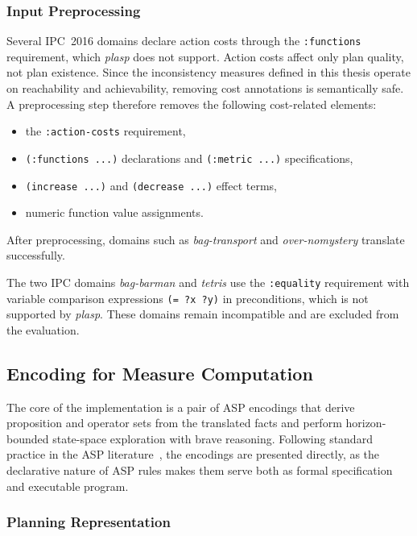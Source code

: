 \subsubsection{Input Preprocessing}

Several \ac{IPC}~2016 domains declare action costs through the \texttt{:functions} requirement, which \textit{plasp} does not support. Action costs affect only plan quality, not plan existence. Since the inconsistency measures defined in this thesis operate on reachability and achievability, removing cost annotations is semantically safe. A preprocessing step therefore removes the following cost-related elements:
\begin{itemize}
    \item the \texttt{:action-costs} requirement,
    \item \texttt{(:functions ...)} declarations and \texttt{(:metric ...)} specifications,
    \item \texttt{(increase ...)} and \texttt{(decrease ...)} effect terms,
    \item numeric function value assignments.
\end{itemize}
After preprocessing, domains such as \textit{bag-transport} and \textit{over-nomystery} translate successfully.

The two \ac{IPC} domains \textit{bag-barman} and \textit{tetris} use the \texttt{:equality} requirement with variable comparison expressions \texttt{(= ?x ?y)} in preconditions, which is not supported by \textit{plasp}. These domains remain incompatible and are excluded from the evaluation.

\subsection{Encoding for Measure Computation}
\label{sec:asp_encoding}

The core of the implementation is a pair of \ac{ASP} encodings that derive proposition and operator sets from the translated facts and perform horizon-bounded state-space exploration with brave reasoning. Following standard practice in the \ac{ASP} literature~\cite{Lifschitz2019,Gebser2012}, the encodings are presented directly, as the declarative nature of \ac{ASP} rules makes them serve both as formal specification and executable program.

\subsubsection{Planning Representation}

